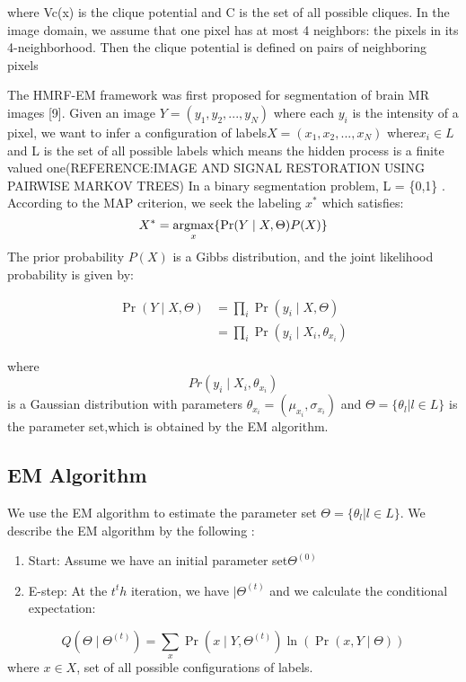 where Vc(x) is the clique potential and C is the set of all possible cliques. In the image domain, we assume that one pixel has at most 4 neighbors: the pixels in its 4-neighborhood. Then the clique potential is defined on pairs of neighboring pixels

The HMRF-EM framework was first proposed for segmentation of brain MR images [9]. Given an image \(Y=(y_1, y_2,..., y_N)\) where each \(y_i\) is the intensity of a pixel, we want to infer a configuration of labels\(X = (x_1,x_2,...,x_N)\) where\(x_i \in L\)  and L is the set of all possible labels which means the hidden process is a finite valued one(REFERENCE:IMAGE AND SIGNAL RESTORATION USING PAIRWISE MARKOV TREES) In a binary segmentation problem, L = \{0,1\} . According to the MAP criterion, we seek the labeling \(x^*\) which satisfies:
\begin{equation}
X^*=\operatorname*{argmax}_x\{\Pr( Y \mid X, \Theta)P(X)\} 
\end{equation}
The prior probability \(P(X)\) is a Gibbs distribution, and the joint likelihood probability is given by:

\begin{equation}\label{eq1}
\begin{split}
\Pr( Y \mid X,\Theta) & =\prod_{i}^{ }\Pr( y_i \mid X,\Theta)\\
& =\prod_{i}^{ }\Pr( y_i \mid X_i,\theta_{x_i})
\end{split}
\end{equation}

where \[Pr( y_i \mid X_i,\theta_{x_i})\] is a Gaussian distribution with parameters
\(\theta_{x_i}=(\mu_{x_i} , \sigma_{x_i})\) and \(\Theta=\{\theta_l\lvert l \in L\}\)
is the parameter set,which is obtained by the EM algorithm.

\subsection{EM Algorithm}
We use the EM algorithm to estimate the parameter set \(\Theta=\{\theta_l\lvert l \in L\}\). We describe the EM algorithm by the following \cite{bordes2007stochastic}:

\begin{enumerate}
	\item Start: Assume we have an initial parameter set\(\Theta^{(0)}\)
	\item  E-step: At the \(t^th\) iteration, we have  \(|\Theta^{(t)}\) and we calculate the conditional expectation:
\end{enumerate}
\begin{equation}
Q(\Theta \mid \Theta^{(t)}) = {\sum\limits_{x} }\Pr( x \mid Y,\Theta^{(t)})\ln (\Pr( x,Y \mid \Theta))
\end{equation}
where $ x \in X$, set of all possible configurations of labels.

